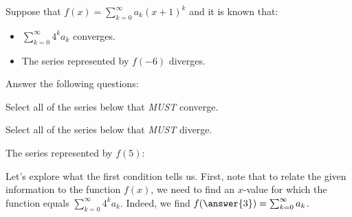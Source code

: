 \documentclass{ximera}
\author{Jim Talamo}
\begin{document}
\begin{exercise}
Suppose that $f(x) = \sum_{k=0}^{\infty} a_k (x+1)^k$ and it is known that:

\begin{itemize}
\item $\sum_{k=0}^{\infty} 4^k a_k$ converges.
\item The series represented by $f(-6)$ diverges.
\end{itemize}



Answer the following questions:

\begin{exercise}
Select all of the series below that \emph{MUST} converge.
\begin{selectAll}
\end{selectAll}
\end{exercise}

\begin{exercise}
Select all of the series below that \emph{MUST} diverge.
\begin{selectAll}
\end{selectAll}
\end{exercise}

\begin{exercise}
The series represented by $f(5)$:

\begin{multipleChoice}
\end{multipleChoice}
\end{exercise}


\begin{hint}

\begin{question}
Let's explore what the first condition tells us.  First, note that to relate the given information to the function $f(x)$, we need to find an $x$-value for which the function equals $\sum_{k=0}^{\infty} 4^k a_k$.  Indeed, we find $f(\answer{3}) = \sum_{k=0}^{\infty} a_k$.  


\end{question}
\end{hint}
\end{exercise}
\end{document}

